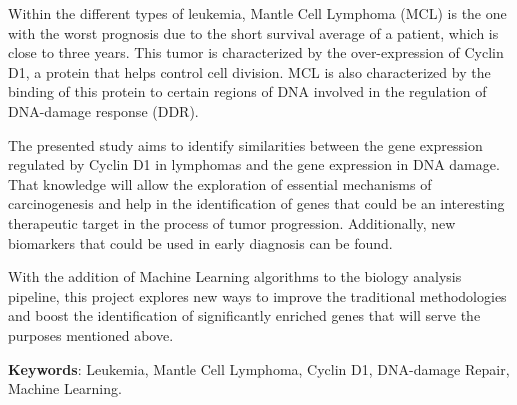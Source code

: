 Within the different types of leukemia, Mantle Cell Lymphoma (MCL) is the one with the worst prognosis due to the short survival average of a patient, which is close to three years.
This tumor is characterized by the over-expression of Cyclin D1, a protein that helps control cell division. MCL is also characterized by the binding of this protein to certain regions of DNA involved in the regulation of DNA-damage response (DDR).


The presented study aims to identify similarities between the gene expression regulated by Cyclin D1 in lymphomas and the gene expression in DNA damage.
That knowledge will allow the exploration of essential mechanisms of carcinogenesis and help in the identification of genes that could be an interesting therapeutic target in the process of tumor progression. Additionally, new biomarkers that could be used in early diagnosis can be found.

With the addition of Machine Learning algorithms to the biology analysis pipeline, this project explores new ways to improve the traditional methodologies and boost the identification of significantly enriched genes that will serve the purposes mentioned above.



\vspace{1.5cm}

\textbf{Keywords}: Leukemia, Mantle Cell Lymphoma, Cyclin D1, DNA-damage Repair, Machine Learning.